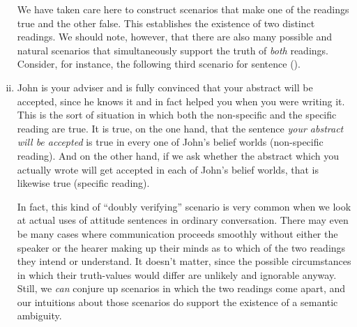 \begin{enumerate}[(i)]
	We have taken care here to construct scenarios that make one of the readings
  true and the other false. This establishes the existence of two distinct
  readings. We should note, however, that there are also many possible and
  natural scenarios that simultaneously support the truth of \emph{both}
  readings. Consider, for instance, the following third scenario for sentence
  (\lastx).
	
\item John is your adviser and is fully convinced that your abstract will be
  accepted, since he knows it and in fact helped you when you were writing it.
  This is the sort of situation in which both the non-specific and the specific
  reading are true. It is true, on the one hand, that the sentence \emph{your
    abstract will be accepted} is true in every one of John's belief worlds
  (non-specific reading). And on the other hand, if we ask whether the abstract
  which you actually wrote will get accepted in each of John's belief worlds,
  that is likewise true (specific reading).
	
	In fact, this kind of ``doubly verifying'' scenario is very common when we
  look at actual uses of attitude sentences in ordinary conversation. There may
  even be many cases where communication proceeds smoothly without either the
  speaker or the hearer making up their minds as to which of the two readings
  they intend or understand. It doesn't matter, since the possible circumstances
  in which their truth-values would differ are unlikely and ignorable anyway.
  Still, we \emph{can} conjure up scenarios in which the two readings come
  apart, and our intuitions about those scenarios do support the existence of a
  semantic ambiguity.
  
\end{enumerate}

